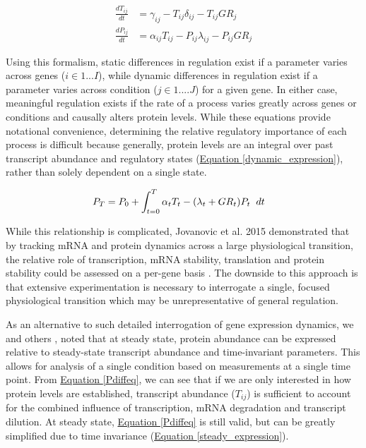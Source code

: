 \begin{subequations}
\begin{align}
\frac{dT_{ij}}{dt} &= \gamma_{ij} - T_{ij}\delta_{ij} - T_{ij}GR_{j}\label{Tdiffeq}\\
\frac{dP_{ij}}{dt} &= \alpha_{ij}T_{ij} - P_{ij}\lambda_{ij} - P_{ij}GR_{j}\label{Pdiffeq}
\end{align}
\end{subequations}

Using this formalism, static differences in regulation exist if a parameter varies across genes ($i \in 1 ... I$), while dynamic differences in regulation exist if a parameter varies across condition ($j \in 1....J$) for a given gene.  In either case, meaningful regulation exists if the rate of a process varies greatly across genes or conditions and causally alters protein levels. While these equations provide notational convenience, determining the relative regulatory importance of each process is difficult because generally, protein levels are an integral over past transcript abundance and regulatory states (\hyperref[dynamic_expression]{Equation \ref{dynamic_expression}}), rather than solely dependent on a single state.

\begin{align}
P_{T} &= P_{0} + \int_{t = 0}^{T} \alpha_{t} T_{t} - (\lambda_{t} + GR_{t}) P_{t} \hspace{2mm} dt \label{dynamic_expression}
\end{align}

While this relationship is complicated, Jovanovic et al. 2015 demonstrated that by tracking mRNA and protein dynamics across a large physiological transition, the relative role of transcription, mRNA stability, translation and protein stability could be assessed on a per-gene basis \cite{Jovanovic:2015hp}. The downside to this approach is that extensive experimentation is necessary to interrogate a single, focused physiological transition which may be unrepresentative of general regulation.

As an alternative to such detailed interrogation of gene expression dynamics, we and others \cite{Belle:2006hv, Csardi:2015kx}, noted that at steady state, protein abundance can be expressed relative to steady-state transcript abundance and time-invariant parameters. This allows for analysis of a single condition based on measurements at a single time point.  From \hyperref[Pdiffeq]{Equation \ref{Pdiffeq}}, we can see that if we are only interested in how protein levels are established, transcript abundance ($T_{ij}$) is sufficient to account for the combined influence of transcription, mRNA degradation and transcript dilution. At steady state, \hyperref[Pdiffeq]{Equation \ref{Pdiffeq}} is still valid, but can be greatly simplified due to time invariance (\hyperref[steady_expression]{Equation \ref{steady_expression}}).

